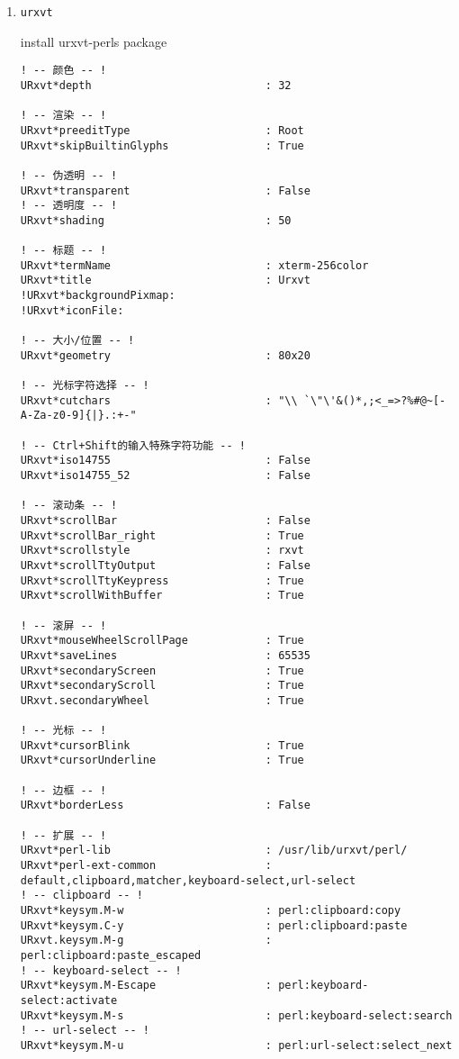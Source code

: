 \documentclass[11pt]{article}
\begin{document}
\begin{enumerate}
\item \texttt{urxvt}
\label{sec:org44c3a32}

install urxvt-perls package

\lstset{language=conf-xdefaults,label= ,caption= ,captionpos=b,numbers=none}
\begin{lstlisting}
! -- 颜色 -- !
URxvt*depth                           : 32

! -- 渲染 -- !
URxvt*preeditType                     : Root
URxvt*skipBuiltinGlyphs               : True

! -- 伪透明 -- !
URxvt*transparent                     : False
! -- 透明度 -- !
URxvt*shading                         : 50

! -- 标题 -- !
URxvt*termName                        : xterm-256color
URxvt*title                           : Urxvt
!URxvt*backgroundPixmap:
!URxvt*iconFile:

! -- 大小/位置 -- !
URxvt*geometry                        : 80x20

! -- 光标字符选择 -- !
URxvt*cutchars                        : "\\ `\"\'&()*,;<_=>?%#@~[-A-Za-z0-9]{|}.:+-"

! -- Ctrl+Shift的输入特殊字符功能 -- !
URxvt*iso14755                        : False
URxvt*iso14755_52                     : False

! -- 滚动条 -- !
URxvt*scrollBar                       : False
URxvt*scrollBar_right                 : True
URxvt*scrollstyle                     : rxvt
URxvt*scrollTtyOutput                 : False
URxvt*scrollTtyKeypress               : True
URxvt*scrollWithBuffer                : True

! -- 滚屏 -- !
URxvt*mouseWheelScrollPage            : True
URxvt*saveLines                       : 65535
URxvt*secondaryScreen                 : True
URxvt*secondaryScroll                 : True
URxvt.secondaryWheel                  : True

! -- 光标 -- !
URxvt*cursorBlink                     : True
URxvt*cursorUnderline                 : True

! -- 边框 -- !
URxvt*borderLess                      : False

! -- 扩展 -- !
URxvt*perl-lib                        : /usr/lib/urxvt/perl/
URxvt*perl-ext-common                 : default,clipboard,matcher,keyboard-select,url-select
! -- clipboard -- !
URxvt*keysym.M-w                      : perl:clipboard:copy
URxvt*keysym.C-y                      : perl:clipboard:paste
URxvt.keysym.M-g                      : perl:clipboard:paste_escaped
! -- keyboard-select -- !
URxvt*keysym.M-Escape                 : perl:keyboard-select:activate
URxvt*keysym.M-s                      : perl:keyboard-select:search
! -- url-select -- !
URxvt*keysym.M-u                      : perl:url-select:select_next


\end{lstlisting}
\end{enumerate}
\end{document}
